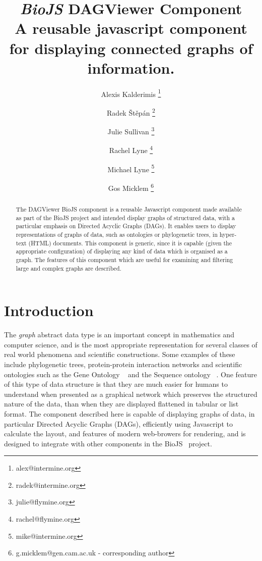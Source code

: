 \documentclass[10pt,a4paper,twocolumn]{article}
\begin{document}
\title{\textit{BioJS} DAGViewer Component \\
\small{A reusable javascript component for displaying connected graphs of information.}
}

\author[1]{Alexis Kalderimis \thanks{alex@intermine.org}}
\author[1]{Radek Štěpán \thanks{radek@intermine.org}}
\author[1]{Julie Sullivan \thanks{julie@flymine.org}}
\author[1]{Rachel Lyne \thanks{rachel@flymine.org}}
\author[1]{Michael Lyne \thanks{mike@intermine.org}}
\author[1]{Gos Micklem \thanks{g.micklem@gen.cam.ac.uk - corresponding author}}

\maketitle
\thispagestyle{fancy}


\begin{abstract}

The DAGViewer BioJS component is a reusable Javascript
component made available as part of the BioJS project and intended
display graphs of structured data, with a particular emphasis on
Directed Acyclic Graphs (DAGs). It enables users to
display representations of graphs of data, such as ontologies
or phylogenetic trees, in hyper-text (HTML) documents. 
This component is generic, since it is capable (given the appropriate configuration)
of displaying any kind of data which is organised as a graph.
The features of this component which are useful for examining and
filtering large and complex graphs are described.

\end{abstract}
\clearpage

\section*{Introduction}

The \emph{graph} abstract data type is an important concept in mathematics
and computer science, and is the most appropriate representation for several
classes of real world phenomena and scientific constructions. Some examples of
these include phylogenetic trees, protein-protein interaction networks and 
scientific ontologies such as the Gene Ontology ~\cite{GO} and the Sequence
ontology ~\cite{SO}. One feature of this type of data structure is that they are
much easier for humans to understand when presented as a graphical network which
preserves the structured nature of the data, than
when they are displayed flattened in tabular or list format. The component described
here is capable of displaying graphs of data, in particular Directed Acyclic Graphs (DAGs),
efficiently using Javascript to calculate the layout, and features of
modern web-browers for rendering, and is designed to integrate with other components
in the BioJS~\cite{site:biojs} project.
\end{document}
